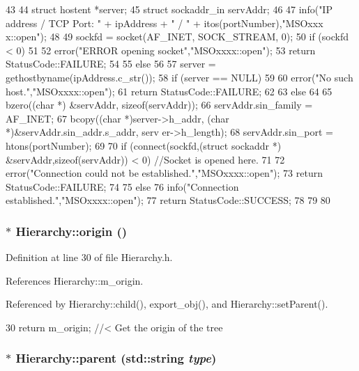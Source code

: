 \begin{DoxyCode}
43 {
44     struct hostent *server;
45     struct sockaddr_in servAddr;
46 
47     info("IP address / TCP Port: " + ipAddress + " / " + itos(portNumber),"MSOxxx
      x::open");
48 
49     sockfd = socket(AF_INET, SOCK_STREAM, 0);
50     if (sockfd < 0) 
51     {
52         error("ERROR opening socket","MSOxxxx::open");
53         return StatusCode::FAILURE;
54     }
55     else
56     {
57         server = gethostbyname(ipAddress.c_str());
58         if (server == NULL)
59         {
60             error("No such host.","MSOxxxx::open");
61             return StatusCode::FAILURE;
62         }
63         else
64         {
65             bzero((char *) &servAddr, sizeof(servAddr));
66             servAddr.sin_family = AF_INET;
67             bcopy((char *)server->h_addr, (char *)&servAddr.sin_addr.s_addr, serv
      er->h_length);
68             servAddr.sin_port = htons(portNumber);
69 
70             if (connect(sockfd,(struct sockaddr *) &servAddr,sizeof(servAddr)) < 
      0) //Socket is opened here.
71             {
72                 error("Connection could not be established.","MSOxxxx::open");
73                 return StatusCode::FAILURE;
74             }
75             else 
76                 info("Connection established.","MSOxxxx::open");
77                 return StatusCode::SUCCESS;
78         }
79     }
80 }
\end{DoxyCode}
\hypertarget{classHierarchy_aee461dc930ce3871636ff87f075b1b83}{
\subsubsection[{origin}]{$\ast$ Hierarchy::origin ()}}
\label{classHierarchy_aee461dc930ce3871636ff87f075b1b83}


Definition at line 30 of file Hierarchy.h.

References Hierarchy::m\_\-origin.

Referenced by Hierarchy::child(), export\_\-obj(), and Hierarchy::setParent().


\begin{DoxyCode}
30 { return m_origin; }  //< Get the origin of the tree
\end{DoxyCode}
\hypertarget{classHierarchy_ad550588733bf75ac5c0fcfd7c8fd11a6}{
\subsubsection[{parent}]{ $\ast$ Hierarchy::parent (std::string {\em type})}}
\label{classHierarchy_ad550588733bf75ac5c0fcfd7c8fd11a6}


